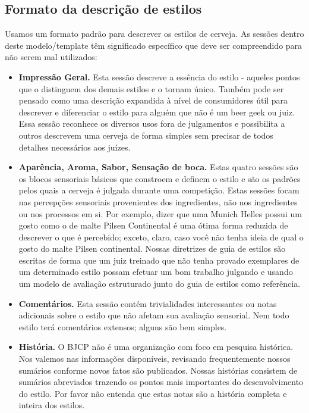 \subsection*{Formato da descrição de estilos}

Usamos um formato padrão para descrever os estilos de cerveja. As sessões dentro deste modelo/template têm significado específico que deve ser compreendido para não serem mal utilizados:
\begin{itemize}
\item \textbf{Impressão Geral.} Esta sessão descreve a essência do estilo - aqueles pontos que o distinguem dos demais estilos e o tornam único. Também pode ser pensado como uma descrição expandida à nível de consumidores útil para descrever e diferenciar o estilo para alguém que não é um beer geek ou juiz. Essa sessão reconhece os diversos usos fora de julgamentos e possibilita a outros descrevem uma cerveja de forma simples sem precisar de todos detalhes necessários aos juízes.
\item \textbf{Aparência, Aroma, Sabor, Sensação de boca.} Estas quatro sessões são os blocos sensoriais básicos que constroem e definem o estilo e são os padrões pelos quais a cerveja é julgada durante uma competição. Estas sessões focam nas percepções sensoriais provenientes dos ingredientes, não nos ingredientes ou nos processos em si. Por exemplo, dizer que uma Munich Helles possui um gosto como o de malte Pilsen Continental é uma ótima forma reduzida de descrever o que é percebido; exceto, claro, caso você não tenha ideia de qual o gosto do malte Pilsen continental. Nossas diretrizes de guia de estilos são escritas de forma que um juiz treinado que não tenha provado exemplares de um determinado estilo possam efetuar um bom trabalho julgando e usando um modelo de avaliação estruturado junto do guia de estilos como referência.
\item \textbf{Comentários.} Esta sessão contém trivialidades interessantes ou notas adicionais sobre o estilo que não afetam sua avaliação sensorial. Nem todo estilo terá comentários extensos; alguns são bem simples.
\item \textbf{História.} O BJCP não é uma organização com foco em pesquisa histórica. Nos valemos nas informações disponíveis, revisando frequentemente nossos sumários conforme novos fatos são publicados. Nossas histórias consistem de sumários abreviados trazendo os pontos mais importantes do desenvolvimento do estilo. Por favor não entenda que estas notas são a história completa e inteira dos estilos.

\end{itemize}
